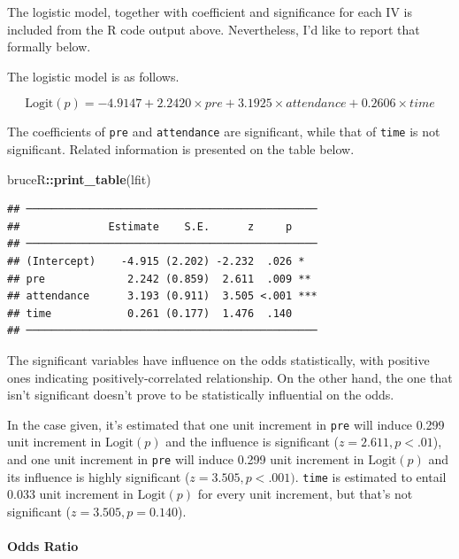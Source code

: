 \documentclass[
]{ctexart}
\newenvironment{Shaded}{\begin{snugshade}}{\end{snugshade}}
\newcommand{\FunctionTok}[1]{\textcolor[rgb]{0.13,0.29,0.53}{\textbf{#1}}}
\newcommand{\NormalTok}[1]{#1}
\newcommand{\SpecialCharTok}[1]{\textcolor[rgb]{0.81,0.36,0.00}{\textbf{#1}}}
\begin{document}
The logistic model, together with coefficient and significance for each
IV is included from the R code output above. Nevertheless, I'd like to
report that formally below.

The logistic model is as follows.

\[
\text{Logit}(p)=-4.9147+2.2420\times pre+3.1925\times attendance+0.2606\times time
\]

The coefficients of \texttt{pre} and \texttt{attendance} are
significant, while that of \texttt{time} is not significant. Related
information is presented on the table below.

\begin{Shaded}
\begin{Highlighting}[]
\NormalTok{bruceR}\SpecialCharTok{::}\FunctionTok{print\_table}\NormalTok{(lfit)}
\end{Highlighting}
\end{Shaded}

\begin{verbatim}
## ──────────────────────────────────────────────
##              Estimate    S.E.      z     p    
## ──────────────────────────────────────────────
## (Intercept)    -4.915 (2.202) -2.232  .026 *  
## pre             2.242 (0.859)  2.611  .009 ** 
## attendance      3.193 (0.911)  3.505 <.001 ***
## time            0.261 (0.177)  1.476  .140    
## ──────────────────────────────────────────────
\end{verbatim}

The significant variables have influence on the odds statistically, with
positive ones indicating positively-correlated relationship. On the
other hand, the one that isn't significant doesn't prove to be
statistically influential on the odds.

In the case given, it's estimated that one unit increment in
\texttt{pre} will induce 0.299 unit increment in \(\text{Logit}(p)\) and
the influence is significant (\(z=2.611,p<.01\)), and one unit increment
in \texttt{pre} will induce 0.299 unit increment in \(\text{Logit}(p)\)
and its influence is highly significant (\(z=3.505,p<.001)\).
\texttt{time} is estimated to entail 0.033 unit increment in
\(\text{Logit}(p)\) for every unit increment, but that's not significant
(\(z = 3.505,p=0.140\)).

\hypertarget{odds-ratio}{%
\paragraph{Odds Ratio}\label{odds-ratio}}
\end{document}
